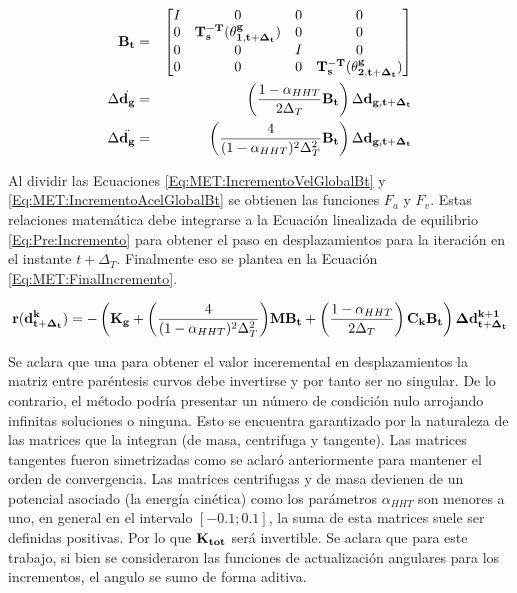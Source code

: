 \begin{eqnarray}
	\label{Eq:MET:DefBt}
	\bf{B}_t & = & \bf{\begin{bmatrix}
			I& 0 & 0 & 0\\ 
			0 & \bf{T_s^{-T}}(\bf{\theta^g_{1,{t+\Delta_t}}}) & 0 & 0\\ 
			0& 0 & I & 0\\ 
			0 & 0 & 0 & \bf{T_s^{-T}}(\bf{\theta^g_{2,{t+\Delta_t}}})
	\end{bmatrix}}\\
	\label{Eq:MET:IncrementoVelGlobalBt}
	\Delta \dot{\bf{d_g}}&=& \left(\frac{1-\alpha_{HHT}}{2\Delta_T} \bf{B_t}\right) \Delta
	\bf{d_{g,{t+\Delta_t}}}\\
	\label{Eq:MET:IncrementoAcelGlobalBt}
	\Delta \ddot{\bf{d_g}}&=& \left( \frac{4}{(1-\alpha_{HHT})^2 \Delta_T^2} \bf{B_t} \right)\Delta
	\bf{d_{g,{t+\Delta_t}}}
\end{eqnarray}	



Al dividir las Ecuaciones \eqref{Eq:MET:IncrementoVelGlobalBt} y \eqref{Eq:MET:IncrementoAcelGlobalBt} se obtienen las funciones $F_a$ y $F_v$. Estas relaciones matemática debe integrarse a la Ecuación linealizada de equilibrio \eqref{Eq:Pre:Incremento} para obtener el paso en desplazamientos para la iteración en el instante $t+\Delta_T$. Finalmente eso se plantea en la Ecuación \eqref{Eq:MET:FinalIncremento}.


\begin{equation}\label{Eq:MET:FinalIncremento}
	\bf{r}(\bf{d}^k_{t+\Delta_t})=  -\left
	(\bf{K}_g+\text{$\left( \frac{4}{(1-\alpha_{HHT})^2\Delta_T^2} \right)$} \bf{M}\bf{B}_t + \left(\text{$\frac{1-\alpha_{HHT}}{2\Delta_T}$}\right) \bf{C}_k \bf{B}_t \right)\Delta\bf{d}^{k+1}_{t+\Delta_t}
\end{equation}

Se aclara que una para obtener el valor inceremental en desplazamientos la matriz entre paréntesis curvos debe invertirse y por tanto ser no singular. De lo contrario, el método podría presentar un número de condición nulo arrojando infinitas soluciones o ninguna.  Esto se encuentra garantizado por la naturaleza de las matrices que la integran (de masa, centrifuga y tangente). Las matrices tangentes fueron simetrizadas como se aclaró anteriormente para mantener el orden de convergencia. Las matrices centrifugas y de masa devienen de un potencial asociado (la energía cinética) como los parámetros $\alpha_{HHT}$ son menores a uno, en general en el intervalo $[-0.1;0.1]$, la suma de esta matrices suele ser definidas positivas. Por lo que $\bf{K}_{tot}$ será invertible. Se aclara que para este trabajo, si bien se consideraron las funciones de actualización angulares para los incrementos, el angulo se sumo de forma aditiva. 

